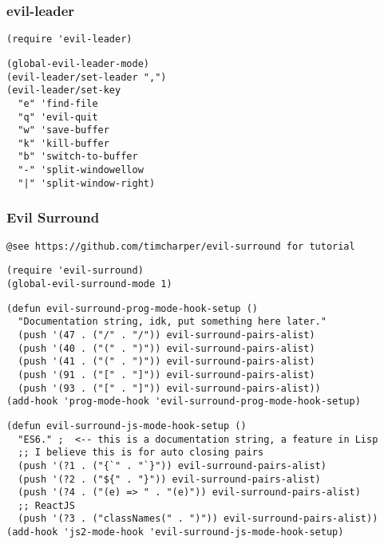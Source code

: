 \documentclass[11pt]{article}
\begin{document}
\subsubsection*{evil-leader}
\label{sec:orgcd98b28}

\begin{verbatim}
(require 'evil-leader)
\end{verbatim}

\begin{verbatim}
(global-evil-leader-mode)
(evil-leader/set-leader ",")
(evil-leader/set-key
  "e" 'find-file
  "q" 'evil-quit
  "w" 'save-buffer
  "k" 'kill-buffer
  "b" 'switch-to-buffer
  "-" 'split-windowellow
  "|" 'split-window-right)
\end{verbatim}

\subsubsection*{Evil Surround}
\label{sec:orgbe1a706}
\begin{verbatim}
@see https://github.com/timcharper/evil-surround for tutorial
\end{verbatim}

\begin{verbatim}
(require 'evil-surround)
(global-evil-surround-mode 1)
\end{verbatim}

\begin{verbatim}
(defun evil-surround-prog-mode-hook-setup ()
  "Documentation string, idk, put something here later."
  (push '(47 . ("/" . "/")) evil-surround-pairs-alist)
  (push '(40 . ("(" . ")")) evil-surround-pairs-alist)
  (push '(41 . ("(" . ")")) evil-surround-pairs-alist)
  (push '(91 . ("[" . "]")) evil-surround-pairs-alist)
  (push '(93 . ("[" . "]")) evil-surround-pairs-alist))
(add-hook 'prog-mode-hook 'evil-surround-prog-mode-hook-setup)
\end{verbatim}

\begin{verbatim}
(defun evil-surround-js-mode-hook-setup ()
  "ES6." ;  <-- this is a documentation string, a feature in Lisp
  ;; I believe this is for auto closing pairs
  (push '(?1 . ("{`" . "`}")) evil-surround-pairs-alist)
  (push '(?2 . ("${" . "}")) evil-surround-pairs-alist)
  (push '(?4 . ("(e) => " . "(e)")) evil-surround-pairs-alist)
  ;; ReactJS
  (push '(?3 . ("classNames(" . ")")) evil-surround-pairs-alist))
(add-hook 'js2-mode-hook 'evil-surround-js-mode-hook-setup)
\end{verbatim}
\end{document}
